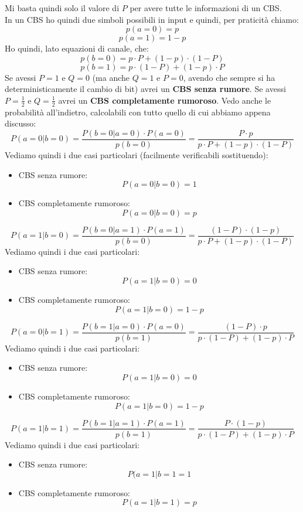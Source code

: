 \documentclass[a4paper,12pt, oneside]{book}
\begin{document}
Mi basta quindi solo il valore di $P$ per avere tutte le informazioni di un
CBS. \\
In un CBS ho quindi due simboli possibili in input e quindi, per praticità
chiamo: 
\[p(a=0)=p\]
\[p(a=1)=1-p\]
Ho quindi, lato equazioni di canale, che:
\[p(b=0)=p\cdot P+(1-p)\cdot (1-P)\]
\[p(b=1)=p\cdot (1-P)+ (1-p)\cdot P\]
Se avessi $P=1$ e $Q=0$ (ma anche $Q=1$ e $P=0$, avendo che sempre si ha
deterministicamente il cambio di bit) avrei un \textbf{CBS senza
  rumore}. Se avessi $P=\frac{1}{2}$ e $Q=\frac{1}{2}$ avrei un \textbf{CBS
  completamente rumoroso}.
Vedo anche le probabilità all'indietro, calcolabili con tutto quello di cui
abbiamo appena discusso:
\[P(a=0|b=0)=\frac{P(b=0|a=0)\cdot P(a=0)}{p(b=0)}=\frac{P\cdot p}{p\cdot
    P+(1-p)\cdot (1-P)}\]
Vediamo quindi i due casi particolari (facilmente verificabili sostituendo):
\begin{itemize}
  \item CBS senza rumore:
  \[P(a=0|b=0)=1\]
  \item CBS completamente rumoroso:
  \[P(a=0|b=0)=p\]
\end{itemize}
\[P(a=1|b=0)=\frac{P(b=0|a=1)\cdot P(a=1)}{p(b=0)}=\frac{(1-P)\cdot
    (1-p)}{p\cdot P+(1-p)\cdot (1-P)}\]
Vediamo quindi i due casi particolari:
\begin{itemize}
  \item CBS senza rumore:
  \[P(a=1|b=0)=0\]
  \item CBS completamente rumoroso:
  \[P(a=1|b=0)=1-p\]
\end{itemize}
\[P(a=0|b=1)=\frac{P(b=1|a=0)\cdot P(a=0)}{p(b=1)}=\frac{(1-P)\cdot p}{p\cdot
    (1-P)+ (1-p)\cdot P}\]  
Vediamo quindi i due casi particolari:
\begin{itemize}
  \item CBS senza rumore:
  \[P(a=1|b=0)=0\]
  \item CBS completamente rumoroso:
  \[P(a=1|b=0)=1-p\]
\end{itemize}
\[P(a=1|b=1)=\frac{P(b=1|a=1)\cdot P(a=1)}{p(b=1)}=\frac{P\cdot
    (1-p)}{p\cdot (1-P)+ (1-p)\cdot P}\]
Vediamo quindi i due casi particolari:
\begin{itemize}
  \item CBS senza rumore:
  \[P(a=1|b=1=1\]
  \item CBS completamente rumoroso:
  \[P(a=1|b=1)=p\]
\end{itemize}
\end{document}
